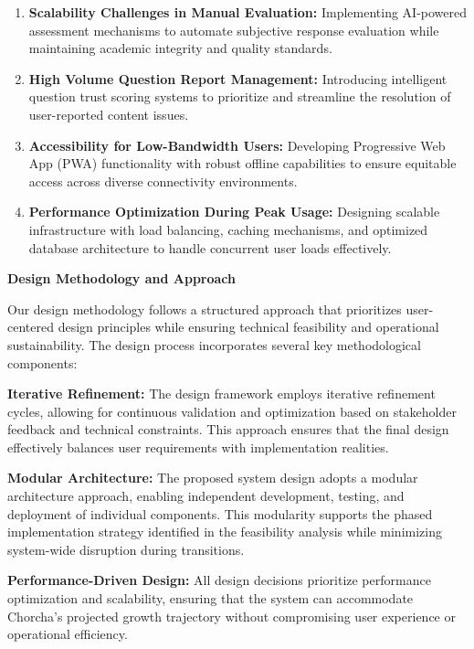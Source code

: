 \documentclass[12pt,a4paper,oneside]{book}
\begin{document}
\begin{enumerate}
    \item \textbf{Scalability Challenges in Manual Evaluation:} Implementing AI-powered assessment mechanisms to automate subjective response evaluation while maintaining academic integrity and quality standards.
    
    \item \textbf{High Volume Question Report Management:} Introducing intelligent question trust scoring systems to prioritize and streamline the resolution of user-reported content issues.
    
    \item \textbf{Accessibility for Low-Bandwidth Users:} Developing Progressive Web App (PWA) functionality with robust offline capabilities to ensure equitable access across diverse connectivity environments.
    
    \item \textbf{Performance Optimization During Peak Usage:} Designing scalable infrastructure with load balancing, caching mechanisms, and optimized database architecture to handle concurrent user loads effectively.
    
\end{enumerate}

\textbf{Design Methodology and Approach}

Our design methodology follows a structured approach that prioritizes user-centered design principles while ensuring technical feasibility and operational sustainability. The design process incorporates several key methodological components:

\textbf{Iterative Refinement:} The design framework employs iterative refinement cycles, allowing for continuous validation and optimization based on stakeholder feedback and technical constraints. This approach ensures that the final design effectively balances user requirements with implementation realities.

\textbf{Modular Architecture:} The proposed system design adopts a modular architecture approach, enabling independent development, testing, and deployment of individual components. This modularity supports the phased implementation strategy identified in the feasibility analysis while minimizing system-wide disruption during transitions.

\textbf{Performance-Driven Design:} All design decisions prioritize performance optimization and scalability, ensuring that the system can accommodate Chorcha's projected growth trajectory without compromising user experience or operational efficiency.
\end{document}
